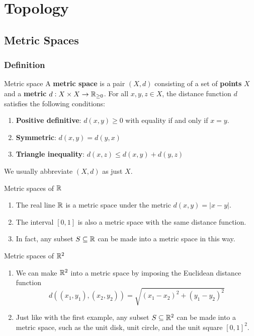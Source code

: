 \part{Topology}
\chapter{Metric Spaces}
\section{Definition}
\begin{defn}{Metric space}{}
A \textbf{metric space} is a pair $(X,d)$ consisting of a set of \textbf{points} $X$ and a \textbf{metric} $d:X \times X \to \mathbb R_{\ge 0}$. For all $x,y,z \in X$, the distance function $d$ satisfies the following conditions:
\begin{enumerate}[label=\textbf{M\arabic*}]
\item \textbf{Positive definitive}: $d(x,y) \ge 0$ with equality if and only if $x=y$.
\item \textbf{Symmetric}: $d(x,y) = d(y,x)$
\item \textbf{Triangle inequality}: $d(x,z) \le d(x,y) + d(y,z)$
\end{enumerate}
\end{defn}

\begin{notation}
We usually abbreviate $(X,d)$ as just $X$.
\end{notation}

\begin{exmp}{Metric spaces of $\mathbb R$}{} 
\begin{enumerate}[label=(\alph*)]
\item The real line $\mathbb R$ is a metric space under the metric $d(x,y) = |x-y|$.
\item The interval $[0,1]$ is also a metric space with the same distance function.
\item In fact, any subset $S \subseteq \mathbb R$ can be made into a metric space in this way.
\end{enumerate}
\end{exmp}

\begin{exmp}{Metric spaces of $\mathbb R^2$}{} 
\begin{enumerate}[label=(\alph*)]
\item We can make $\mathbb R^2$ into a metric space by imposing the Euclidean distance function
\[ d((x_1, y_1),(x_2, y_2)) = \sqrt{(x_1-x_2)^2+(y_1-y_2)^2} \]
\item Just like with the first example, any subset $S \subseteq \mathbb R^2$ can be made into a metric space, such as the unit disk, unit circle, and the unit square $[0,1]^2$.
\end{enumerate}
\end{exmp}

